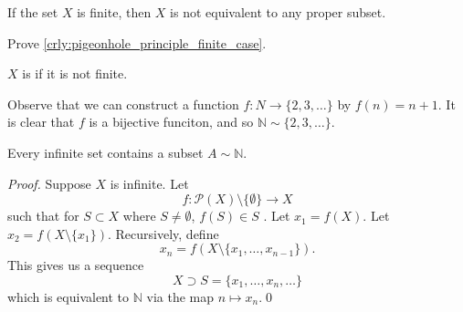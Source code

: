 \documentclass[notoc,notitlepage]{tufte-book}
\begin{document}
\begin{crly}\label{crly:pigeonhole_principle_finite_case}
  If the set $X$ is finite, then $X$ is not equivalent to any proper subset.
\end{crly}

\begin{ex}
  Prove \cref{crly:pigeonhole_principle_finite_case}.
\end{ex}

\begin{defn}\label{defn:infinite_sets}
$X$ is  if it is not finite.
\end{defn}

\begin{eg}
  Observe that we can construct a function $f : N \to \{ 2, 3, \ldots \}$ by $f(n) = n + 1$. It is clear that $f$ is a bijective funciton, and so $\mathbb{N} \sim \{2, 3, \ldots \}$.
\end{eg}

\begin{propo}\label{propo:_n_is_the_smallest_infinite_set}
  Every infinite set contains a subset $A \sim \mathbb{N}$.
\end{propo}

\begin{proof}
  Suppose $X$ is infinite. Let
  \begin{equation*}
    f : \mathcal{P}(X) \setminus \{ \emptyset \} \to X
  \end{equation*}
  such that for $S \subset X$ where $S \neq \emptyset$, $f(S) \in S$ . Let $x_1 = f(X)$. Let $x_2 = f(X \setminus \{ x_1 \})$. Recursively, define
  \begin{equation*}
    x_n = f(X \setminus \{x_1, \ldots, x_{n - 1}\}).
  \end{equation*}
  This gives us a sequence
  \begin{equation*}
    X \supset S = \{x_1, \ldots, x_n, \ldots \}
  \end{equation*}
  which is equivalent to $\mathbb{N}$ via the map $n \mapsto x_n$.\qed
\end{proof}
\end{document}

